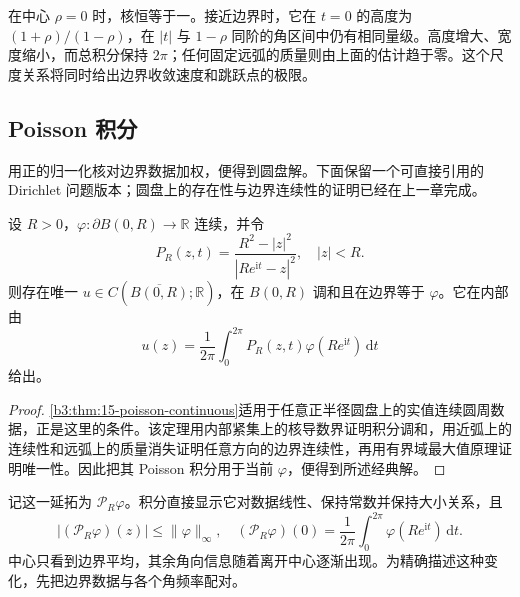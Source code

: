 在中心 \(\rho=0\) 时，核恒等于一。接近边界时，它在 \(t=0\) 的高度为 \((1+\rho)/(1-\rho)\)，在 \(|t|\) 与 \(1-\rho\) 同阶的角区间中仍有相同量级。高度增大、宽度缩小，而总积分保持 \(2\pi\)；任何固定远弧的质量则由上面的估计趋于零。这个尺度关系将同时给出边界收敛速度和跳跃点的极限。

\subsection{Poisson 积分}
\label{b3:subsec:160103}

用正的归一化核对边界数据加权，便得到圆盘解。下面保留一个可直接引用的 Dirichlet 问题版本；圆盘上的存在性与边界连续性的证明已经在上一章完成。

\begin{theorem}[圆盘 Dirichlet 问题]\label{b3:thm:16-poisson}
设 \(R>0\)，\(\varphi:\partial B(0,R)\to\mathbb R\) 连续，并令
\[
 P_R(z,t)=\frac{R^2-|z|^2}{|Re^{\mathrm i t}-z|^2},
 \quad |z|<R.
\]
则存在唯一 \(u\in C(\overline{B(0,R)};\mathbb R)\)，在 \(B(0,R)\) 调和且在边界等于 \(\varphi\)。它在内部由
\[
 u(z)=\frac1{2\pi}\int_0^{2\pi}
 P_R(z,t)\varphi(Re^{\mathrm i t})\,\mathrm dt
\]
给出。
\end{theorem}
\begin{proof}
\cref{b3:thm:15-poisson-continuous}适用于任意正半径圆盘上的实值连续圆周数据，正是这里的条件。该定理用内部紧集上的核导数界证明积分调和，用近弧上的连续性和远弧上的质量消失证明任意方向的边界连续性，再用有界域最大值原理证明唯一性。因此把其 Poisson 积分用于当前 \(\varphi\)，便得到所述经典解。
\end{proof}

记这一延拓为 \(\mathcal P_R\varphi\)。积分直接显示它对数据线性、保持常数并保持大小关系，且
\[
 |(\mathcal P_R\varphi)(z)|
 \le\|\varphi\|_\infty,
 \quad
 (\mathcal P_R\varphi)(0)
 =\frac1{2\pi}\int_0^{2\pi}\varphi(Re^{\mathrm i t})\,\mathrm dt.
\]
中心只看到边界平均，其余角向信息随着离开中心逐渐出现。为精确描述这种变化，先把边界数据与各个角频率配对。

